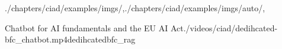 \begin{graphicspathcontext}{{./chapters/ciad/examples/imgs/},{./chapters/ciad/examples/imgs/auto/},\old}

\begin{textvideoframe}{Chatbot for AI fundamentals and the EU AI Act}{./videos/ciad/dedihcated-bfc_chatbot.mp4}{dedihcatedbfc_rag}
\end{textvideoframe}

\end{graphicspathcontext}

\endinput
